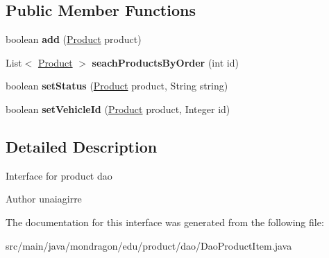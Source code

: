 \subsection*{Public Member Functions}
\begin{DoxyCompactItemize}
\item 
\mbox{\label{interfacemondragon_1_1edu_1_1product_1_1dao_1_1_dao_product_item_a42d7ebfc7d27bd70099b26e117941866}} 
boolean {\bfseries add} (\mbox{\hyperlink{classmondragon_1_1edu_1_1clases_1_1_product}{Product}} product)
\item 
\mbox{\label{interfacemondragon_1_1edu_1_1product_1_1dao_1_1_dao_product_item_ada9894f8abbe2bbb3a5cb227231558fa}} 
List$<$ \mbox{\hyperlink{classmondragon_1_1edu_1_1clases_1_1_product}{Product}} $>$ {\bfseries seach\+Products\+By\+Order} (int id)
\item 
\mbox{\label{interfacemondragon_1_1edu_1_1product_1_1dao_1_1_dao_product_item_ab0a1b79edfd238216ca32cd7a43f7a5a}} 
boolean {\bfseries set\+Status} (\mbox{\hyperlink{classmondragon_1_1edu_1_1clases_1_1_product}{Product}} product, String string)
\item 
\mbox{\label{interfacemondragon_1_1edu_1_1product_1_1dao_1_1_dao_product_item_ada2d0d0dc2125bb2107293cffb4e93c5}} 
boolean {\bfseries set\+Vehicle\+Id} (\mbox{\hyperlink{classmondragon_1_1edu_1_1clases_1_1_product}{Product}} product, Integer id)
\end{DoxyCompactItemize}


\subsection{Detailed Description}
Interface for product dao

\begin{DoxyAuthor}{Author}
unaiagirre 
\end{DoxyAuthor}


The documentation for this interface was generated from the following file\+:\begin{DoxyCompactItemize}
\item 
src/main/java/mondragon/edu/product/dao/Dao\+Product\+Item.\+java\end{DoxyCompactItemize}
